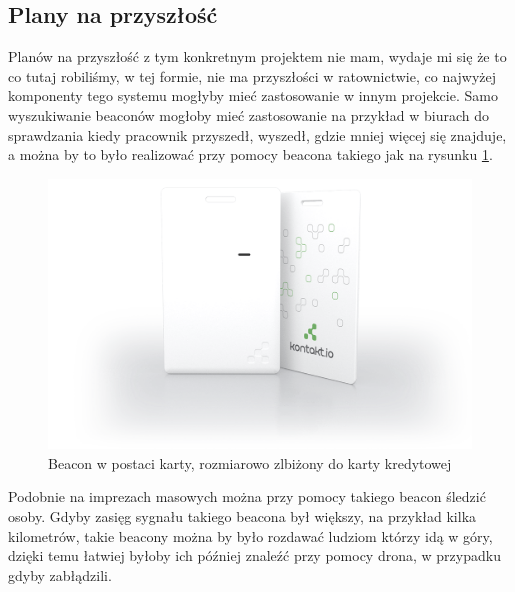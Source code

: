 \subsection{Plany na przyszłość}

Planów na przyszłość z tym konkretnym projektem nie mam, wydaje mi się że to co tutaj robiliśmy, w tej formie, nie ma przyszłości w ratownictwie, co najwyżej komponenty tego systemu mogłyby mieć zastosowanie w innym projekcie. Samo wyszukiwanie beaconów mogłoby mieć zastosowanie na przykład w biurach do sprawdzania kiedy pracownik przyszedł, wyszedł, gdzie mniej więcej się znajduje, a można by to było realizować przy pomocy beacona takiego jak na rysunku \ref{fig:beaconcard}.

\begin{figure}[!th]
    \centering
    \includegraphics[width=15cm]{zalaczniki/obrazy/beacon_card.png}
    \caption{Beacon w postaci karty, rozmiarowo zlbiżony do karty kredytowej}
    \label{fig:beaconcard}
\end{figure}

Podobnie na imprezach masowych można przy pomocy takiego beacon śledzić osoby. Gdyby zasięg sygnału takiego beacona był większy, na przykład kilka kilometrów, takie beacony można by było rozdawać ludziom którzy idą w góry, dzięki temu łatwiej byłoby ich później znaleźć przy pomocy drona, w przypadku gdyby zabłądzili.
